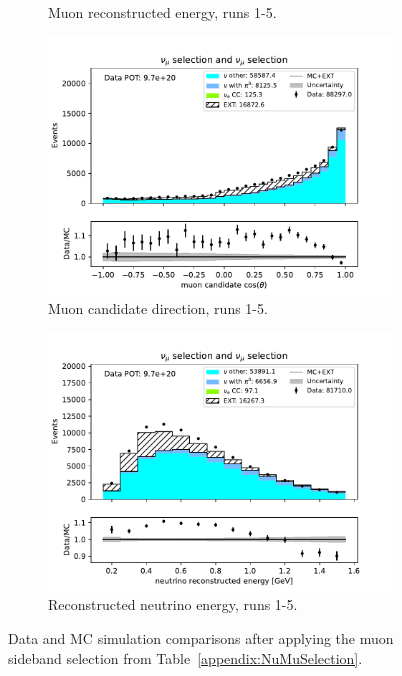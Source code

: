 \begin{figure}[H]
\begin{subfigure}{0.33\linewidth}
        \caption{Muon reconstructed energy, runs 1-5.}
    \end{subfigure}%
    \begin{subfigure}{0.33\linewidth}
        \captionsetup{width=0.6\linewidth}
        \includegraphics[width=\linewidth]{technote/Sidebands/Figures/NuMuSideband/muon_sideband_muon_theta_run1234b4c4d_NUMU_NUMU.pdf}
        \caption{Muon candidate direction, runs 1-5.}
    \end{subfigure}%
    \begin{subfigure}{0.33\linewidth}
        \captionsetup{width=0.7\linewidth}
        \includegraphics[width=\linewidth]{technote/Sidebands/Figures/NuMuSideband/muon_sideband_neutrino_energy_run1234b4c4d_NUMU_NUMU.pdf}
        \caption{Reconstructed neutrino energy, runs 1-5.}
    \end{subfigure}
    \caption{Data and MC simulation comparisons after applying the muon sideband selection from Table~\ref{appendix:NuMuSelection}.}
\end{figure}